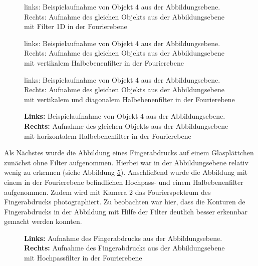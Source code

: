 \begin{figure}
	\centering
	\caption{links: Beispielaufnahme von Objekt 4 aus der Abbildungsebene. Rechts: Aufnahme des gleichen Objekts aus der Abbildungsebene mit Filter 1D in der Fourierebene}
	\label{fig:example12_Filter1D}
\end{figure}

\begin{figure}
	\centering
	\caption{links: Beispielaufnahme von Objekt 4 aus der Abbildungsebene. Rechts: Aufnahme des gleichen Objekts aus der Abbildungsebene mit vertikalem Halbebenenfilter in der Fourierebene}
	\label{fig:example17}
\end{figure}

\begin{figure}
	\centering
	\caption{links: Beispielaufnahme von Objekt 4 aus der Abbildungsebene. Rechts: Aufnahme des gleichen Objekts aus der Abbildungsebene mit vertikalem und diagonalem Halbebenenfilter in der Fourierebene}
	\label{fig:example18}
\end{figure}

\begin{figure}
	\centering
	\caption{
		\textbf{Links:} Beispielaufnahme von Objekt 4 aus der Abbildungsebene. \textbf{Rechts:} Aufnahme des gleichen Objekts aus der Abbildungsebene mit horizontalem Halbebenenfilter in der Fourierebene
	}
	\label{fig:example19}
\end{figure}

Als Nächstes wurde die Abbildung eines Fingerabdrucks auf einem Glasplättchen zunächst ohne Filter aufgenommen. Hierbei war in der Abbildungsebene relativ wenig zu erkennen (siehe Abbildung \ref{fig:example20_Hochpass}). Anschließend wurde die Abbildung mit einem in der Fourierebene befindlichen Hochpass- und einem Halbebenenfilter aufgenommen. Zudem wird mit Kamera 2 das Fourierspektrum des Fingerabdrucks photographiert. Zu beobachten war hier, dass die Konturen de Fingerabdrucks in der Abbildung mit Hilfe der Filter deutlich besser erkennbar gemacht werden konnten.\\


\begin{figure}
	\centering
	\caption{
		\textbf{Links:} Aufnahme des Fingerabdrucks aus der Abbildungsebene.
		\textbf{Rechts:} Aufnahme des Fingerabdrucks aus der Abbildungsebene mit Hochpassfilter in der Fourierebene
	}
	\label{fig:example20_Hochpass}
\end{figure}


